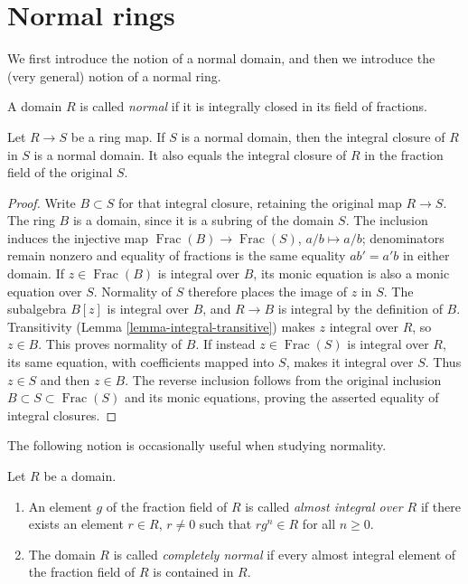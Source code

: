 \section{Normal rings}
\label{section-normal-rings}

\noindent
We first introduce the notion of a normal domain, and then we
introduce the (very general) notion of a normal ring.

\begin{definition}
\label{definition-domain-normal}
A domain $R$ is called {\it normal} if it is integrally
closed in its field of fractions.
\end{definition}

\begin{lemma}
\label{lemma-integral-closure-in-normal}
Let $R \to S$ be a ring map.
If $S$ is a normal domain, then the integral closure of $R$
in $S$ is a normal domain. It also equals the integral closure
of $R$ in the fraction field of the original $S$.
\end{lemma}

\begin{proof}
Write $B\subset S$ for that integral closure, retaining the
original map $R\to S$. The ring $B$ is a domain, since it is
a subring of the domain $S$. The inclusion induces the injective
map $\operatorname{Frac}(B)\to\operatorname{Frac}(S)$,
$a/b\mapsto a/b$; denominators remain nonzero and equality of
fractions is the same equality $ab'=a'b$ in either domain.
If $z\in\operatorname{Frac}(B)$ is integral over $B$, its monic
equation is also a monic equation over $S$. Normality of $S$
therefore places the image of $z$ in $S$. The subalgebra $B[z]$
is integral over $B$, and $R\to B$ is integral by the definition
of $B$. Transitivity (Lemma \ref{lemma-integral-transitive}) makes
$z$ integral over $R$, so $z\in B$. This proves normality of $B$.
If instead $z\in\operatorname{Frac}(S)$ is integral over $R$,
its same equation, with coefficients mapped into $S$, makes it
integral over $S$. Thus $z\in S$ and then $z\in B$.
The reverse inclusion follows from the original inclusion
$B\subset S\subset\operatorname{Frac}(S)$ and its monic equations,
proving the asserted equality of integral closures.
\end{proof}

\noindent
The following notion is occasionally useful when
studying normality.

\begin{definition}
\label{definition-almost-integral}
Let $R$ be a domain.
\begin{enumerate}
\item An element $g$ of the fraction
field of $R$ is called {\it almost integral over $R$}
if there exists an element $r \in R$, $r\not = 0$
such that $rg^n \in R$ for all $n \geq 0$.
\item The domain $R$ is called {\it completely normal} if every
almost integral element of the fraction field of $R$ is
contained in $R$.
\end{enumerate}
\end{definition}


